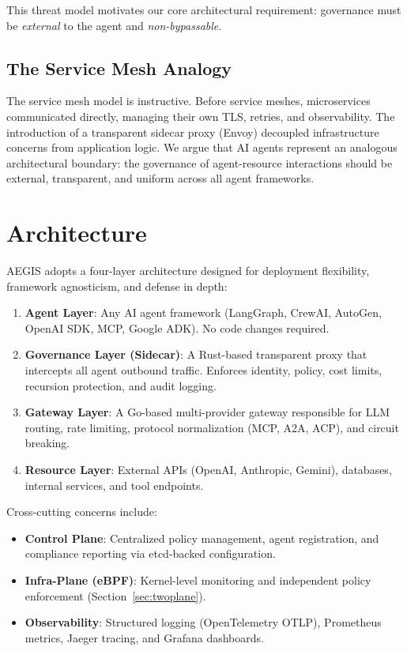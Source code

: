 \documentclass[runningheads]{llncs}
\begin{document}
This threat model motivates our core architectural requirement: governance must be \emph{external} to the agent and \emph{non-bypassable}.

\subsection{The Service Mesh Analogy}

The service mesh model is instructive. Before service meshes, microservices communicated directly, managing their own TLS, retries, and observability. The introduction of a transparent sidecar proxy (Envoy) decoupled infrastructure concerns from application logic. We argue that AI agents represent an analogous architectural boundary: the governance of agent-resource interactions should be external, transparent, and uniform across all agent frameworks.

\section{Architecture}

AEGIS adopts a four-layer architecture designed for deployment flexibility, framework agnosticism, and defense in depth:

\begin{enumerate}
\item \textbf{Agent Layer}: Any AI agent framework (LangGraph, CrewAI, AutoGen, OpenAI SDK, MCP, Google ADK). No code changes required.
\item \textbf{Governance Layer (Sidecar)}: A Rust-based transparent proxy that intercepts all agent outbound traffic. Enforces identity, policy, cost limits, recursion protection, and audit logging.
\item \textbf{Gateway Layer}: A Go-based multi-provider gateway responsible for LLM routing, rate limiting, protocol normalization (MCP, A2A, ACP), and circuit breaking.
\item \textbf{Resource Layer}: External APIs (OpenAI, Anthropic, Gemini), databases, internal services, and tool endpoints.
\end{enumerate}

Cross-cutting concerns include:
\begin{itemize}
\item \textbf{Control Plane}: Centralized policy management, agent registration, and compliance reporting via etcd-backed configuration.
\item \textbf{Infra-Plane (eBPF)}: Kernel-level monitoring and independent policy enforcement (Section~\ref{sec:twoplane}).
\item \textbf{Observability}: Structured logging (OpenTelemetry OTLP), Prometheus metrics, Jaeger tracing, and Grafana dashboards.
\end{itemize}
\end{document}
